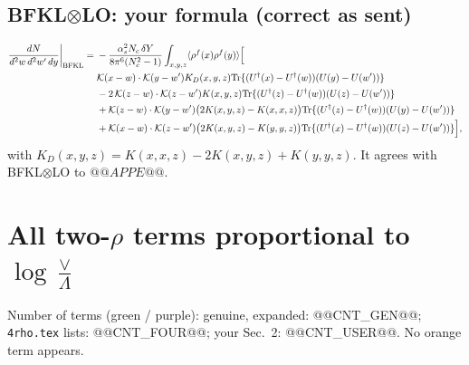 \documentclass[10pt]{article}
\numberwithin{equation}{section}
\begin{document}
\subsection{BFKL$\otimes$LO: your formula (correct as sent)}
\begin{align}
\frac{dN}{d^2w\,d^2w'\,dy}\bigg|_{\rm BFKL}={}&-\frac{\alpha_s^2N_c\,\delta Y}{8\pi^6(N_c^2-1)}\int_{x,y,z}\langle\rho^f(x)\rho^f(y)\rangle\Big[\notag\\
&\mathcal K(x-w)\cdot\mathcal K(y-w')K_D(x,y,z){\rm Tr}\{(U^\dagger(x)-U^\dagger(w))(U(y)-U(w'))\}\notag\\
&-2\,\mathcal K(z-w)\cdot\mathcal K(z-w')K(x,y,z){\rm Tr}\{(U^\dagger(z)-U^\dagger(w))(U(z)-U(w'))\}\notag\\
&+\mathcal K(z-w)\cdot\mathcal K(y-w')\big(2K(x,y,z)-K(x,x,z)\big){\rm Tr}\{(U^\dagger(z)-U^\dagger(w))(U(y)-U(w'))\}\notag\\
&+\mathcal K(x-w)\cdot\mathcal K(z-w')\big(2K(x,y,z)-K(y,y,z)\big){\rm Tr}\{(U^\dagger(x)-U^\dagger(w))(U(z)-U(w'))\}\Big],
\label{eq:BFKL}
\end{align}
with $K_D(x,y,z)=K(x,x,z)-2K(x,y,z)+K(y,y,z)$. It agrees with BFKL$\otimes$LO to $@@APPE@@$.

\section{All two-$\rho$ terms proportional to $\log\frac{\vee}{\Lambda}$}\label{sec:two}
Number of terms (green / purple): genuine, expanded: @@CNT_GEN@@; \texttt{4rho.tex} lists: @@CNT_FOUR@@; your Sec.~2: @@CNT_USER@@. No orange term appears.
\end{document}
